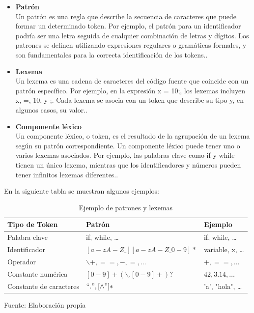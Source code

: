 \begin{itemize}
  \item \textbf{Patrón} \\
  Un patrón es una regla que describe la secuencia de caracteres que puede formar un determinado token. Por ejemplo, el patrón para un identificador podría ser una letra seguida de cualquier combinación de letras y dígitos. Los patrones se definen utilizando expresiones regulares o gramáticas formales, y son fundamentales para la correcta identificación de los tokens.. \parencite{Jeffery2021}
  \item \textbf{Lexema} \\
  Un lexema es una cadena de caracteres del código fuente que coincide con un patrón específico. Por ejemplo, en la expresión x = 10;, los lexemas incluyen x, =, 10, y ;. Cada lexema se asocia con un token que describe su tipo y, en algunos casos, su valor.. \parencite{Jeffery2021}
  \item \textbf{Componente léxico} \\
  Un componente léxico, o token, es el resultado de la agrupación de un lexema según su patrón correspondiente. Un componente léxico puede tener uno o varios lexemas asociados. Por ejemplo, las palabras clave como if y while tienen un único lexema, mientras que los identificadores y números pueden tener infinitos lexemas diferentes.. \parencite{Jeffery2021}
\end{itemize}

En la siguiente tabla se muestran algunos ejemplos:

\begin{table}[!h]
  \begin{center}
    \begin{tabularx}{0.8\textwidth}{|X|X|X|}
      \hline
      \textbf{Tipo de Token} & \textbf{Patrón} & \textbf{Ejemplo} \\
      \hline
      Palabra clave & if, while, … & if, while, … \\
      \hline
      Identificador & $[a-zA-Z\_] [a-zA-Z\_0-9]*$ & variable, x, … \\
      \hline
      Operador & $\backslash +, ==, -, =, …$ & $+, ==, …$ \\
      \hline
      Constante numérica & $[0-9]+(\backslash .[0-9]+)?$ & $42, 3.14, …$ \\
      \hline
      Constante de caracteres & $``.", [\land "]*$ & 'a', "hola", … \\
      \hline
    \end{tabularx}
  \end{center}
  \caption{Ejemplo de patrones y lexemas}
  \centering Fuente: Elaboración propia
  \label{tab:patrones}
\end{table}

